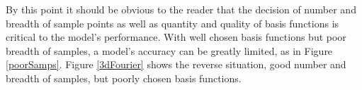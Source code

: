 \par By this point it should be obvious to the reader that the decision of number and breadth of sample points as well as quantity and quality of basis functions is critical to the model's performance. With well chosen basis functions but poor breadth of samples, a model's accuracy can be greatly limited, as in Figure \ref{poorSamps}. Figure \ref{3dFourier} shows the reverse situation, good number and breadth of samples, but poorly chosen basis functions. 


